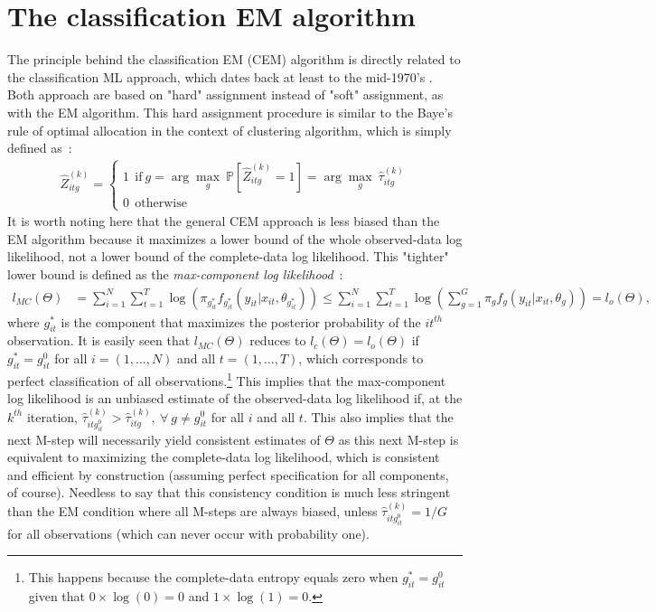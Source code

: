 \documentclass[11pt,letter]{article}
\begin{document}
\section{The classification EM algorithm}
The principle behind the classification EM (CEM) algorithm is directly related to the classification ML approach, which dates back at least to the mid-1970's \citep{mclachlan_iterative_1975}. Both approach are based on "hard" assignment instead of "soft" assignment, as with the EM algorithm. This hard assignment procedure is similar to the Baye's rule of optimal allocation in the context of clustering algorithm, which is simply defined as~:
\begin{align*}
\hat{Z}_{itg}^{(k)} =
\begin{cases}
 1 \ \ \text{if} \ g = \arg\underset{g}\max  \ \mathbb{P}[\hat{Z}^{(k)}_{itg}=1] =\arg\underset{g}\max  \ \hat{\tau}^{(k)}_{itg} \\
 0 \ \ \text{otherwise}
\end{cases}
\end{align*}
It is worth noting here that the general CEM approach is less biased than the EM algorithm because it maximizes a lower bound of the whole observed-data log likelihood, not a lower bound of the complete-data log likelihood. This "tighter" lower bound is defined as the \textit{max-component log likelihood}~:
\begin{align}\label{eqn:17}
l_{MC}(\Theta) &=  \sum_{i=1}^N \sum_{t=1}^T \log (\pi_{g_{it}^*}f_{g_{it}^*}(y_{it}|x_{it},\theta_{g_{it}^*})) \le  \sum_{i=1}^N \sum_{t=1}^T \log (\sum_{g=1}^G \pi_gf_g(y_{it}|x_{it},\theta_g)) = l_{o}(\Theta),
\end{align}
where $g_{it}^*$ is the component that maximizes the posterior probability of the $it^{th}$ observation. It is easily seen that $l_{MC}(\Theta)$ reduces to $l_{c}(\Theta) = l_{o}(\Theta)$ if $g^*_{it} = g^0_{it}$ for all $i = (1,...,N)$ and all $t = (1,...,T)$, which corresponds to perfect classification of all observations.\footnote{This happens because the complete-data entropy equals zero when $g^*_{it} = g^0_{it}$ given that $0 \times \log(0) = 0$ and $1 \times \log(1) = 0$.} This implies that the max-component log likelihood is an unbiased estimate of the observed-data log likelihood if, at the $k^{th}$ iteration, $\hat{\tau}^{(k)}_{itg^0_{it}} > \hat{\tau}^{(k)}_{itg}, \ \forall \ g \ne g^0_{it}$ for all $i$ and all $t$. This also implies that the next M-step will necessarily yield consistent estimates of $\Theta$ as this next M-step is equivalent to maximizing the complete-data log likelihood, which is consistent and efficient by construction (assuming perfect specification for all components, of course). Needless to say that this consistency condition is much less stringent than the EM condition where all M-steps are always biased, unless $\hat{\tau}^{(k)}_{itg^0_{it}} = 1/G$ for all observations (which can never occur with probability one).
\end{document}
